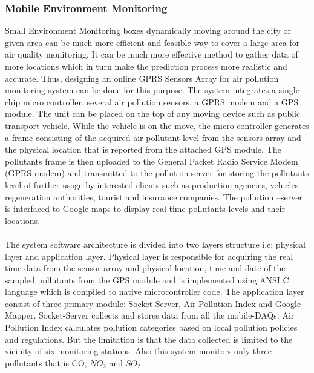 \subsubsection{Mobile Environment Monitoring \cite{23}}
Small Environment Monitoring boxes dynamically moving around the city or given area can be much more efficient and feasible way to cover a large area for air quality monitoring. It can be much more effective method to gather data of more locations which in turn make the prediction process more realistic and accurate. Thus, designing an online GPRS Sensors Array for air pollution monitoring system can be done for this purpose. The system integrates a single chip micro controller, several air pollution sensors, a GPRS modem and a GPS module. The unit can be placed on the top of any moving device such as public transport vehicle. While the vehicle is on the move, the micro controller generates a frame consisting of the acquired air pollutant level from the sensors array and the physical location that is reported from the attached GPS module. The pollutants frame is then uploaded to the General Packet Radio Service Modem (GPRS-modem) and transmitted to the pollution-server for storing the pollutants level of further usage by interested clients such as production agencies, vehicles regeneration authorities, tourist and insurance companies. The pollution –server is interfaced to Google maps to display real-time pollutants levels and their locations. 
\\
\\
The system software architecture is divided into two layers structure i.e; physical layer and application layer. Physical layer is responsible for acquiring the real time data from the sensor-array and physical location, time and date of the sampled pollutants from the GPS module and is implemented using ANSI C language which is compiled to native microcontroller code. The application layer consist of three primary module: Socket-Server, Air Pollution Index and Google-Mapper. Socket-Server collects and stores data from all the mobile-DAQs. Air Pollution Index calculates pollution categories based on local pollution policies and regulations. But the limitation is that the data collected is limited to the vicinity of six monitoring stations. Also this system monitors only three pollutants that is CO, $NO_2$ and $SO_2$.

